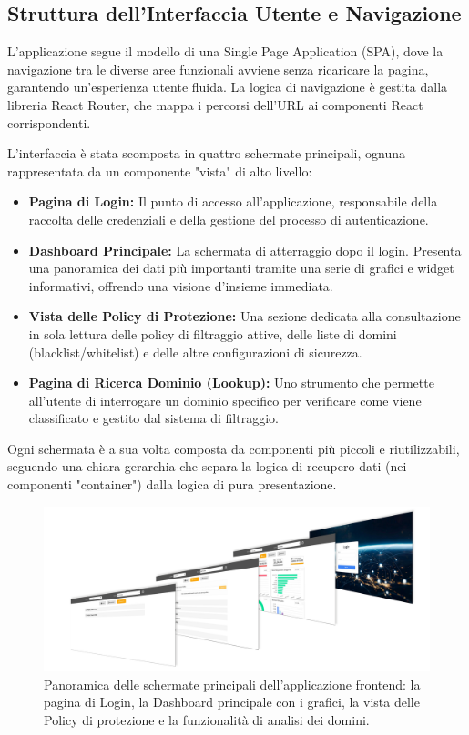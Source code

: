 \documentclass[12pt,a4paper,openright,twoside]{book}
\begin{document}
\subsection{Struttura dell'Interfaccia Utente e Navigazione}
L'applicazione segue il modello di una Single Page Application (SPA), dove la navigazione tra le diverse aree funzionali avviene senza ricaricare la pagina, garantendo un'esperienza utente fluida. La logica di navigazione è gestita dalla libreria React Router, che mappa i percorsi dell'URL ai componenti React corrispondenti.

L'interfaccia è stata scomposta in quattro schermate principali, ognuna rappresentata da un componente "vista" di alto livello:
\begin{itemize}
    \item \textbf{Pagina di Login:} Il punto di accesso all'applicazione, responsabile della raccolta delle credenziali e della gestione del processo di autenticazione.
    \item \textbf{Dashboard Principale:} La schermata di atterraggio dopo il login. Presenta una panoramica dei dati più importanti tramite una serie di grafici e widget informativi, offrendo una visione d'insieme immediata.
    \item \textbf{Vista delle Policy di Protezione:} Una sezione dedicata alla consultazione in sola lettura delle policy di filtraggio attive, delle liste di domini (blacklist/whitelist) e delle altre configurazioni di sicurezza.
    \item \textbf{Pagina di Ricerca Dominio (Lookup):} Uno strumento che permette all'utente di interrogare un dominio specifico per verificare come viene classificato e gestito dal sistema di filtraggio.
\end{itemize}
Ogni schermata è a sua volta composta da componenti più piccoli e riutilizzabili, seguendo una chiara gerarchia che separa la logica di recupero dati (nei componenti "container") dalla logica di pura presentazione.

\begin{figure}[H]
    \centering
    \includegraphics[width=\textwidth]{figures/slideshow.png}
    \caption{Panoramica delle schermate principali dell'applicazione frontend: la pagina di Login, la Dashboard principale con i grafici, la vista delle Policy di protezione e la funzionalità di analisi dei domini.}
    \label{fig:ui_screens}
\end{figure}
\end{document}
